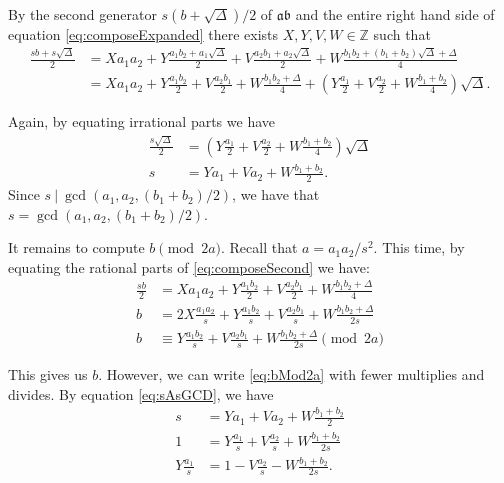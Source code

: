 \documentclass{ucalgthes1}
\theoremstyle{plain}
\theoremstyle{definition}
\newcommand{\ZZ}{\mathbb{Z}}
\begin{document}
By the second generator $s(b+\sqrt\Delta)/2$ of $\mathfrak{a}\mathfrak{b}$ and the entire right hand side of equation \eqref{eq:composeExpanded} there exists $X, Y, V, W \in \ZZ$ such that
\begin{equation}
\label{eq:composeSecond}
\begin{split}
	\frac{sb+s\sqrt\Delta}{2} & = Xa_1a_2 + Y\frac{a_1b_2+a_1\sqrt\Delta}{2} + V\frac{a_2b_1 + a_2\sqrt{\Delta}}{2} + W\frac{b_1b_2 + (b_1+b_2)\sqrt{\Delta} + \Delta}{4} \\
	& = Xa_1a_2 + Y\frac{a_1b_2}{2} + V\frac{a_2b_1}{2} + W\frac{b_1b_2 + \Delta}{4} + \left(Y\frac{a_1}{2} + V\frac{a_2}{2} + W\frac{b_1+b_2}{4}\right)\sqrt\Delta. 
\end{split}
\end{equation}

\noindent
Again, by equating irrational parts we have
\begin{align}
	\frac{s\sqrt\Delta}{2} & = \left(Y\frac{a_1}{2} + V\frac{a_2}{2} + W\frac{b_1+b_2}{4}\right)\sqrt\Delta \nonumber \\
	s & = Ya_1 + Va_2 + W\frac{b_1+b_2}{2}. \label{eq:sAsGCD}
\end{align}
Since $s~|~\gcd(a_1, a_2, (b_1+b_2)/2)$, we have that $s = \gcd(a_1, a_2, (b_1+b_2)/2)$.  

It remains to compute $b \pmod{2a}$.  Recall that $a = a_1a_2/s^2$.  This time, by equating the rational parts of \eqref{eq:composeSecond} we have:
\begin{align}
	\frac{sb}{2} & = Xa_1a_2 + Y\frac{a_1b_2}{2} + V\frac{a_2b_1}{2} + W\frac{b_1b_2 + \Delta}{4} \nonumber \\
	b & = 2X\frac{a_1a_2}{s} + Y\frac{a_1b_2}{s} + V\frac{a_2b_1}{s} + W\frac{b_1b_2 + \Delta}{2s} \nonumber \\
	b & \equiv Y\frac{a_1b_2}{s} + V\frac{a_2b_1}{s} + W\frac{b_1b_2 + \Delta}{2s} \pmod{2a} \label{eq:bMod2a}
\end{align}

\noindent
This gives us $b$.  However, we can write \eqref{eq:bMod2a} with fewer multiplies and divides.  By equation \eqref{eq:sAsGCD}, we have
\begin{align*}
	s & = Ya_1 + Va_2 + W\frac{b_1+b_2}{2} \\
	1 & = Y\frac{a_1}{s} + V\frac{a_2}{s} + W\frac{b_1+b_2}{2s} \\
	Y\frac{a_1}{s} & = 1 - V\frac{a_2}{s} - W\frac{b_1+b_2}{2s}.
\end{align*}
\end{document}

